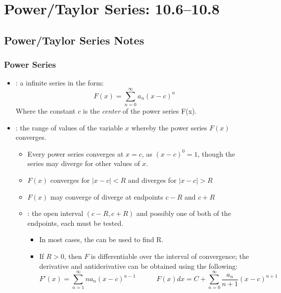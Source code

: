 \chapter{Power/Taylor Series: 10.6--10.8}

\section{Power/Taylor Series Notes}

\vspace{-16pt}
\subsection{Power Series}
\begin{itemize}
  \item {}: a infinite series in the form:
    \[%
    F(x) = \sum_{n=0}^{\infty} a_n (x - c)^n
    \]%
    Where the constant \(c\) is the \textit{center} of the power series F(x).

  \item {}: the range of values of the variable \(x\)
    whereby the power series \(F(x)\) converges.
    \begin{itemize}
      \item Every power series converges at \(x = c\), as \((x-c)^0 = 1\),
        though the series may diverge for other values of \(x\).

      \item \(F(x)\) converges for \(\left| x - c \right| < R \) and diverges
        for \(\left| x - c \right| > R \)

      \item \(F(x)\) may converge of diverge at endpoints \(c-R\) and \(c+R\)

      \item {}: the open interval \((c-R, c+R)\) and
        possibly one of both of the endpoints, each must be tested.
        \begin{itemize}
          \item In most cases, the  can be used to find R.

          \item If \(R > 0\), then \(F\) is differentiable over the interval of
            convergence; the derivative and antiderivative can be obtained
            using the following:
            \[%
            F'(x) = \sum_{n=1}^{\infty} na_n(x-c)^{n-1} \qquad \quad
            F(x)dx = C + \sum_{n=0}^{\infty} \frac{a_n}{n+1}(x-c)^{n+1}
            \]%
        \end{itemize}


\end{itemize}
\end{itemize}
